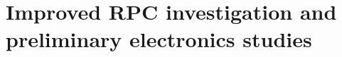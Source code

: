 \renewcommand\evenpagerightmark{{\scshape\small Chapter 5}}
\renewcommand\oddpageleftmark{{\scshape\small Improved RPC investigation and preliminary electronics studies}}

\hyphenation{}

\chapter[Improved RPC investigation and preliminary electronics studies]%
{Improved RPC investigation and preliminary electronics studies}
\label{chapt5}


\clearpage{\pagestyle{empty}\cleardoublepage}